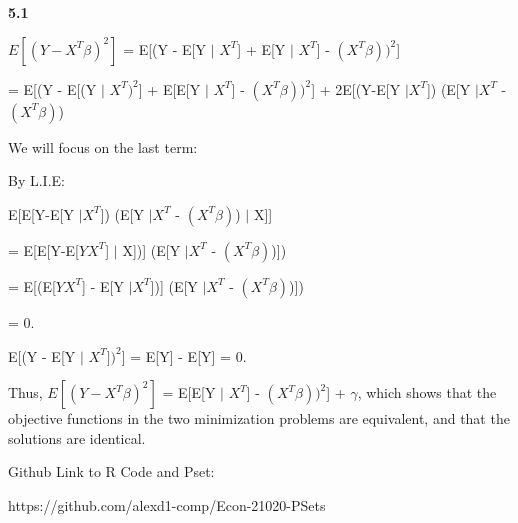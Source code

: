 \documentclass{article}
\begin{document}
\section{}

\textbf{5.1}

$E[(Y- X^{T}\beta)^{2}]$ = E[(Y - E[Y $\mid$ $X^{T}$] + E[Y $\mid$ $X^{T}$] - $(X^{T}\beta))^{2}$]

= E[(Y - E[(Y $\mid$ $X^{T})^{2}$] + E[E[Y $\mid$ $X^{T}$] - $(X^{T}\beta))^{2}$] + 2E[(Y-E[Y $\mid X^{T}$]) (E[Y $\mid X^{T}$ - $(X^{T}\beta)$)

We will focus on the last term:

By L.I.E: 

E[E[Y-E[Y $\mid X^{T}$]) (E[Y $\mid X^{T}$ - $(X^{T}\beta)$) $\mid$ X]]

= E[E[Y-E[$YX^{T}$] $\mid$ X])] (E[Y $\mid X^{T}$ - $(X^{T}\beta)$)])

= E[(E[$YX^{T}$] - E[Y $\mid X^{T}$])] (E[Y $\mid X^{T}$ - $(X^{T}\beta)$)])

= 0.

E[(Y - E[Y $\mid$ $X^{T}])^{2}$] = E[Y] - E[Y] = 0.

Thus, $E[(Y- X^{T}\beta)^{2}]$ = E[E[Y $\mid$ $X^{T}$] - $(X^{T}\beta))^{2}$] + $\gamma$, which shows that the objective functions in the two minimization problems are equivalent, and that the solutions are identical.

\newpage

Github Link to R Code and Pset:

https://github.com/alexd1-comp/Econ-21020-PSets
\end{document}
